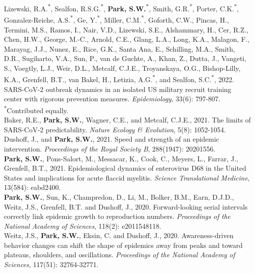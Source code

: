 \documentclass[11pt]{article} %
\begin{document}
 Lizewski, R.A.\textsuperscript{*}, Sealfon, R.S.G.\textsuperscript{*}, \textbf{Park, S.W.}\textsuperscript{*}, Smith, G.R.\textsuperscript{*}, Porter, C.K.\textsuperscript{*}, Gonzalez-Reiche, A.S.\textsuperscript{*}, Ge, Y.\textsuperscript{*}, Miller, C.M.\textsuperscript{*}, Goforth, C.W., Pincas, H., Termini, M.S., Ramos, I., Nair, V.D., Lizewski, S.E., Alshammary, H., Cer, R.Z., Chen, H.W., George, M.-C., Arnold, C.E., Glang, L.A., Long, K.A., Malagon, F., Marayag, J.J., Nunez, E., Rice, G.K., Santa Ana, E., Schilling, M.A., Smith, D.R., Sugiharto, V.A., Sun, P., van de Guchte, A., Khan, Z., Dutta, J., Vangeti, S., Voegtly, L.J., Weir, D.L., Metcalf, C.J.E., Troyanskaya, O.G., Bishop-Lilly, K.A., Grenfell, B.T., van Bakel, H., Letizia, A.G.\textsuperscript{*}, and Sealfon, S.C.\textsuperscript{*}, 2022. SARS-CoV-2 outbreak dynamics in an isolated US military recruit training center with rigorous prevention measures. \textit{Epidemiology}, 33(6): 797-807.\\
\textsuperscript{*}Contributed equally.\\

 Baker, R.E., \textbf{Park, S.W.}, Wagner, C.E., and Metcalf, C.J.E., 2021. The limits of SARS-CoV-2 predictability. \textit{Nature Ecology \& Evolution}, 5(8): 1052-1054.\\

 Dushoff, J., and \textbf{Park, S.W.}, 2021. Speed and strength of an epidemic intervention. \textit{Proceedings of the Royal Society B}, 288(1947): 20201556.\\

 \textbf{Park, S.W.}, Pons-Salort, M., Messacar, K., Cook, C., Meyers, L., Farrar, J., Grenfell, B.T., 2021. Epidemiological dynamics of enterovirus D68 in the United States and implications for acute flaccid myelitis. \textit{Science Translational Medicine}, 13(584): eabd2400.\\

 \textbf{Park, S.W.}, Sun, K., Champredon, D., Li, M., Bolker, B.M., Earn, D.J.D., Weitz, J.S., Grenfell, B.T. and Dushoff, J., 2020. Forward-looking serial intervals correctly link epidemic growth to reproduction numbers. \textit{Proceedings of the National Academy of Sciences}, 118(2): e2011548118.\\

 Weitz, J.S., \textbf{Park, S.W.}, Eksin, C. and Dushoff, J., 2020. Awareness-driven behavior changes can shift the shape of epidemics away from peaks and toward plateaus, shoulders, and oscillations. \textit{Proceedings of the National Academy of Sciences}, 117(51): 32764-32771.\\
\end{document}
